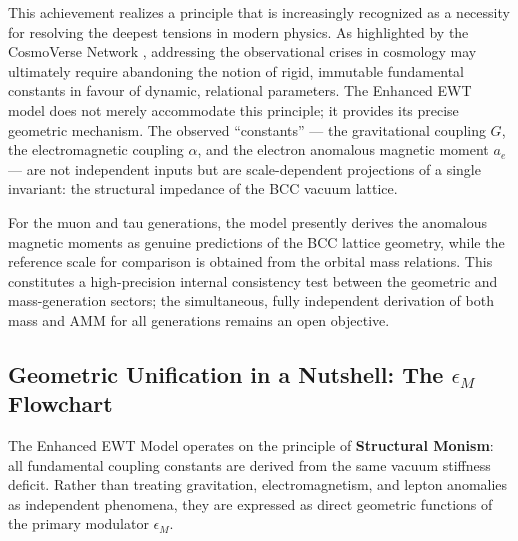 \documentclass[10pt,a4paper]{article}
\begin{document}
This achievement realizes a principle that is increasingly recognized as a necessity for resolving the deepest tensions in modern physics. As highlighted by the CosmoVerse Network \cite{DiValentino2025CosmoVerse}, addressing the observational crises in cosmology may ultimately require abandoning the notion of rigid, immutable fundamental constants in favour of dynamic, relational parameters. The Enhanced EWT model does not merely accommodate this principle; it provides its precise geometric mechanism. The observed ``constants'' — the gravitational coupling \(G\), the electromagnetic coupling \(\alpha\), and the electron anomalous magnetic moment \(a_e\) — are not independent inputs but are scale-dependent projections of a single invariant: the structural impedance of the BCC vacuum lattice.

For the muon and tau generations, the model presently derives the anomalous magnetic moments as genuine predictions of the BCC lattice geometry, while the reference scale for comparison is obtained from the orbital mass relations. This constitutes a high-precision internal consistency test between the geometric and mass-generation sectors; the simultaneous, fully independent derivation of both mass and AMM for all generations remains an open objective.

\vspace{1em}
\noindent
{}
\vspace{1em}

\subsection{Geometric Unification in a Nutshell: The \(\epsilon_M\) Flowchart}
\label{sec:nutshell}

The Enhanced EWT Model operates on the principle of \textbf{Structural Monism}: all fundamental coupling constants are derived from the same vacuum stiffness deficit. Rather than treating gravitation, electromagnetism, and lepton anomalies as independent phenomena, they are expressed as direct geometric functions of the primary modulator \(\epsilon_M\).
\end{document}
